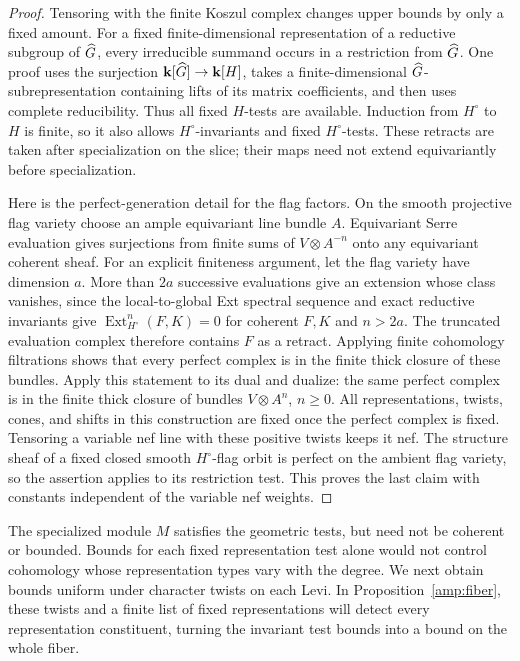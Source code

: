 \begin{proof}
Tensoring with the finite Koszul complex changes upper bounds by
only a fixed amount.  For a fixed finite-dimensional representation
of a reductive subgroup of $\widehat G$, every irreducible summand occurs
in a restriction from $\widehat G$.  One proof uses the surjection
$\mathbf k[\widehat G]\to\mathbf k[H]$, takes a finite-dimensional
$\widehat G$-subrepresentation containing lifts of its matrix coefficients,
and then uses complete reducibility.  Thus all fixed $H$-tests are
available.  Induction from $H^\circ$ to $H$ is finite, so it also
allows $H^\circ$-invariants and fixed $H^\circ$-tests.
These retracts are taken after specialization on the slice; their
maps need not extend equivariantly before specialization.

Here is the perfect-generation detail for the flag factors.
On the smooth projective flag variety choose an ample equivariant
line bundle $A$.  Equivariant Serre evaluation gives surjections
from finite sums of $V\otimes A^{-n}$ onto any equivariant coherent
sheaf.  For an explicit finiteness argument, let the flag variety have
dimension $a$.  More than $2a$ successive evaluations give an
extension whose class vanishes, since the local-to-global Ext
spectral sequence and exact reductive invariants give
$\operatorname{Ext}^{n}_{H^\circ}(F,K)=0$ for coherent $F,K$ and
$n>2a$.  The truncated evaluation complex therefore contains $F$
as a retract.  Applying finite cohomology filtrations shows that
every perfect complex is in the finite thick closure of these
bundles.  Apply this statement to its dual and dualize: the same
perfect complex is in the finite thick closure of bundles
$V\otimes A^n$, $n\geq0$.  All representations, twists, cones,
and shifts in this construction are fixed once the perfect complex
is fixed.  Tensoring a variable nef line with these positive twists
keeps it nef.  The structure sheaf of a fixed closed smooth
$H^\circ$-flag orbit is perfect on the ambient flag variety, so the
assertion applies to its restriction test.  This proves the last
claim with constants independent of the variable nef weights.
\end{proof}

The specialized module $M$ satisfies the geometric tests, but need
not be coherent or bounded. Bounds for each fixed representation
test alone would not control cohomology
whose representation types vary with the degree. We next obtain
bounds uniform under character twists on each Levi. In
Proposition~\ref{amp:fiber}, these twists and a finite list of fixed
representations will detect every representation constituent, turning
the invariant test bounds into a bound on the whole fiber.

